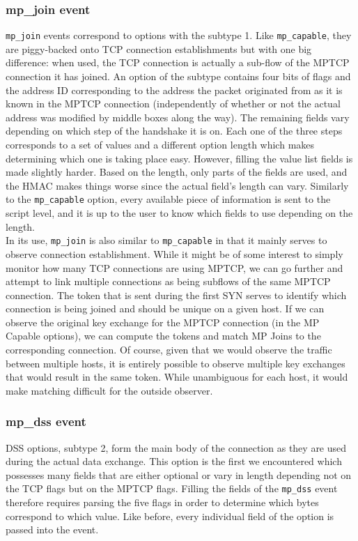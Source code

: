 \documentclass[12pt, a4paper, oneside]{article} %
\begin{document}
\subsubsection{mp\_join event}
\texttt{mp\_join} events correspond to options with the subtype 1. Like \texttt{mp\_capable}, they are piggy-backed onto TCP connection establishments but with one big difference: when used, the TCP connection is actually a sub-flow of the MPTCP connection it has joined. An option of the subtype contains four bits of flags and the address ID corresponding to the address the packet originated from as it is known in the MPTCP connection (independently of whether or not the actual address was modified by middle boxes along the way). The remaining fields vary depending on which step of the handshake it is on. Each one of the three steps corresponds to a set of values and a different option length which makes determining which one is taking place easy. However, filling the value list fields is made slightly harder. Based on the length, only parts of the fields are used, and the HMAC makes things worse since the actual field's length can vary. Similarly to the \texttt{mp\_capable} option, every available piece of information is sent to the script level, and it is up to the user to know which fields to use depending on the length. \\

In its use, \texttt{mp\_join} is also similar to \texttt{mp\_capable} in that it mainly serves to observe connection establishment. While it might be of some interest to simply monitor how many TCP connections are using MPTCP, we can go further and attempt to link multiple connections as being subflows of the same MPTCP connection. The token that is sent during the first SYN serves to identify which connection is being joined and should be unique on a given host. If we can observe the original key exchange for the MPTCP connection (in the MP Capable options), we can compute the tokens and match MP Joins to the corresponding connection. Of course, given that we would observe the traffic between multiple hosts, it is entirely possible to observe multiple key exchanges that would result in the same token. While unambiguous for each host, it would make matching difficult for the outside observer. \\

\subsubsection{mp\_dss event}
DSS options, subtype 2, form the main body of the connection as they are used during the actual data exchange. This option is the first we encountered which possesses many fields that are either optional or vary in length depending not on the TCP flags but on the MPTCP flags. Filling the fields of the \texttt{mp\_dss} event therefore requires parsing the five flags in order to determine which bytes correspond to which value. Like before, every individual field of the option is passed into the event. \\
\end{document}
